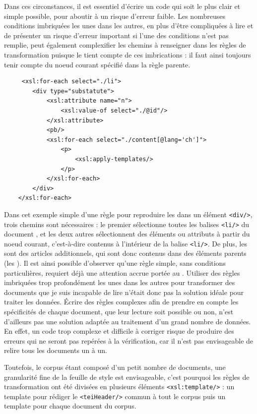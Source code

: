 Dans ces circonstances, il est essentiel d'écrire un code qui soit le plus clair et simple possible, pour aboutir à un risque d'erreur faible. Les nombreuses conditions imbriquées les unes dans les autres, en plus d'être compliquées à lire et de présenter un risque d'erreur important si l'une des conditions n'est pas remplie, peut également complexifier les chemins \xpath à renseigner dans les règles de transformation puisque le \xpath tient compte de ces imbrications : il faut ainsi toujours tenir compte du noeud courant spécifié dans la règle parente. 

\begin{verbatim}
     <xsl:for-each select="./li">
        <div type="substatute">
            <xsl:attribute name="n">
                <xsl:value-of select="./@id"/>
            </xsl:attribute>
            <pb/>
            <xsl:for-each select="./content[@lang='ch']">
                <p>
                    <xsl:apply-templates/>
                </p>
            </xsl:for-each>
        </div>
    </xsl:for-each>
\end{verbatim}

Dans cet exemple simple d'une règle pour reproduire les \li dans un élément \texttt{<div/>}, trois chemins \xpath sont nécessaires : le premier sélectionne toutes les balises \texttt{<li/>} du document \XML, et les deux autres sélectionnent des éléments ou attributs à partir du noeud courant, c'est-à-dire contenus à l'intérieur de la balise \texttt{<li/>}. De plus, les \li sont des articles additionnels, qui sont donc contenus dans des éléments parents (les \lu). Il est ainsi possible d'observer qu'une règle simple, sans conditions particulières, requiert déjà une attention accrue portée au \xpath. Utiliser des règles imbriquées trop profondément les unes dans les autres pour transformer des documents que je suis incapable de lire n'était donc pas la solution idéale pour traiter les données. Écrire des règles complexes afin de prendre en compte les spécificités de chaque document, que leur lecture soit possible ou non, n'est d'ailleurs pas une solution adaptée au traitement d'un grand nombre de données. En effet, un code trop complexe et difficile à corriger risque de produire des erreurs qui ne seront pas repérées à la vérification, car il n'est pas envisageable de relire tous les documents un à un. 

Toutefois, le corpus étant composé d'un petit nombre de documents, une granularité fine de la feuille de style est envisageable, c'est pourquoi les règles de transformation ont été divisées en plusieurs éléments \texttt{<xsl:template/>} : un template pour rédiger le \texttt{<teiHeader/>} commun à tout le corpus puis un template pour chaque document du corpus. 

